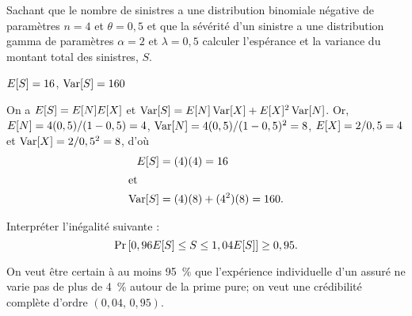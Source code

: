 \begin{exercice}
  Sachant que le nombre de sinistres a une distribution binomiale
  négative de paramètres $n = 4$ et $\theta = 0,5$ et que la sévérité
  d'un sinistre a une distribution gamma de paramètres $\alpha = 2$ et
  $\lambda = 0,5$ calculer l'espérance et la variance du montant total
  des sinistres, $S$.
  \begin{rep}
    $E [ S ] = 16$, $\operatorname{Var} [ S ] = 160$
  \end{rep}
  \begin{sol}
    On a $E [ S ] = E [ N ]E [ X ]$ et $\operatorname{Var} [ S ] = E [ N ]\operatorname{Var} [ X ] +
    E [ X ]^2\operatorname{Var} [ N ]$. Or, $E [ N ] = 4 (0,5)/(1 - 0,5) = 4$, $\operatorname{Var} [ N ]
    = 4 (0,5)/(1 - 0,5)^2 = 8$, $E [ X ] = 2/0,5 = 4$ et $\operatorname{Var} [ X ] =
    2/0,5^2 = 8$, d'où
    \begin{align*}
        E [ S ]
        &= (4)(4)
         = 16 \\
        \intertext{et}
        \operatorname{Var} [ S ]
        &= (4)(8) + (4^2)(8)
         = 160.
    \end{align*}
  \end{sol}
\end{exercice}

\begin{exercice}
  Interpréter l'inégalité suivante :
  \begin{displaymath}
    \Pr
    \left[
      0,96 E [ S ] \leq S \leq 1,04 E [ S ]
    \right]
    \geq 0,95.
  \end{displaymath}
  \begin{rep}
    On veut être certain à au moins 95~\% que l'expérience
    individuelle d'un assuré ne varie pas de plus de 4~\% autour de la
    prime pure; on veut une crédibilité complète d'ordre $(0,04,\,
    0,95)$.
  \end{rep}
\end{exercice}

